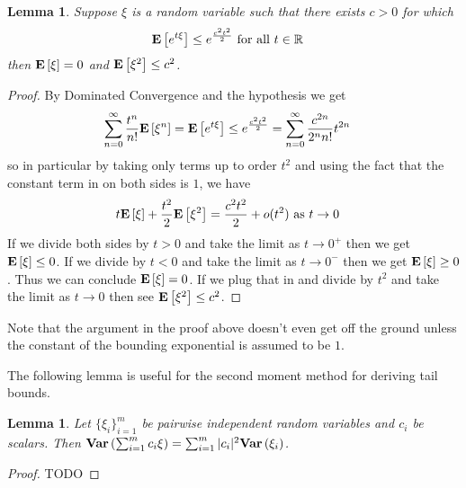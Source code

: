 \documentclass{amsart}
\newtheorem{lem}[thm]{Lemma}
\theoremstyle{remark}
\theoremstyle{definition}
\begin{document}
\begin{lem}Suppose $\xi$ is a random variable such that there exists
  $c>0$ for which
\begin{align*}
\textbf{E}\left[e^{t\xi}\right] &\leq e^{\frac{c^2 t^2}{2}} \text{ for all $t \in \mathbb{R}$}
\end{align*}
then $\textbf{E}\left[\xi\right]=0$ and $\textbf{E}\left[\xi^2\right] \leq c^2$.
\end{lem}
\begin{proof}
By Dominated Convergence and the hypothesis we get
\begin{align*}
\sum_{n=0}^\infty \frac{t^n}{n!}\textbf{E}\left[\xi^n\right] &=
\textbf{E}\left[e^{t\xi}\right] \leq e^{\frac{c^2 t^2}{2}} = \sum_{n=0}^\infty
\frac{c^{2n}}{2^n n!}t^{2n}
\end{align*}
so in particular by taking only terms up to order $t^2$ and using the
fact that the constant term in on both sides is $1$, we have
\begin{align*}
t \textbf{E}\left[\xi\right] + \frac{t^2}{2} \textbf{E}\left[\xi^2\right] &= \frac{c^2 t^2}{2}
+
o(t^2) \text { as $t \to 0$}
\end{align*}
If we divide both sides by $t > 0$ and take the limit as $t \to 0^+$ then we
get $\textbf{E}\left[\xi\right] \leq 0$.  If we divide by $t < 0$ and take the
limit as $t \to 0^-$ then we get $\textbf{E}\left[\xi\right] \geq 0$.  Thus we
can conclude $\textbf{E}\left[\xi\right] = 0$.  If we plug that in and divide
by $t^2$ and take the limit as $t \to 0$ then see $\textbf{E}\left[\xi^2\right]
\leq c^2$.
\end{proof}
Note that the argument in the proof above doesn't even get off the
ground unless the constant of the bounding exponential is assumed to
be $1$.

The following lemma is useful for the second moment method for
deriving tail bounds.
\begin{lem}Let $\{\xi_i\}_{i=1}^m$ be pairwise independent random
  variables and $c_i$ be scalars.  Then $\textbf{Var} \left (\sum_{i=1}^m c_i \xi \right ) =
  \sum_{i=1}^m |c_i|^2\textbf{Var} \left (\xi_i \right )$.
\end{lem}
\begin{proof}
TODO
\end{proof}
\end{document}
